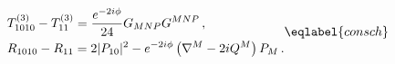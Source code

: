 \begin{equation}
\begin{split}
&T^{(3)}_{1010}-T^{(3)}_{11}=\frac{e^{-2 i\phi}}{24} G_{MNP}G^{MNP}\,,\\
&R_{1010}-R_{11}=2 |P_{10}|^2-e^{-2 i\phi} \left(\nabla^M-2 i Q^M\right)P_M\,.
\end{split}
\eqlabel{consch}
\end{equation}


